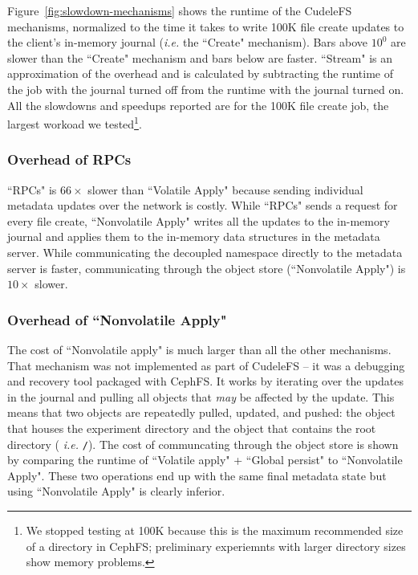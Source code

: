 Figure~\ref{fig:slowdown-mechanisms} shows the runtime of the CudeleFS
mechanisms, normalized to the time it takes to write 100K file create updates
to the client's in-memory journal ({\it i.e.} the ``Create" mechanism). Bars
above \(10^0\) are slower than the ``Create" mechanism and bars below are
faster.  ``Stream" is an approximation of the overhead and is calculated by
subtracting the runtime of the job with the journal turned off from the runtime
with the journal turned on. All the slowdowns and speedups reported are for the
100K file create job, the largest workoad we tested\footnote{We stopped testing
at 100K because this is the maximum recommended size of a directory in CephFS;
preliminary experiemnts with larger directory sizes show memory problems.}.

\subsubsection{Overhead of RPCs} ``RPCs" is \(66\times\) slower than ``Volatile
Apply" because sending individual metadata updates over the network is costly.
While ``RPCs" sends a request for every file create, ``Nonvolatile Apply"
writes all the updates to the in-memory journal and applies them to the
in-memory data structures in the metadata server. While communicating the
decoupled namespace directly to the metadata server is faster, communicating
through the object store (``Nonvolatile Apply") is \(10\times\) slower.

\subsubsection{Overhead of ``Nonvolatile Apply"} The cost of ``Nonvolatile
apply" is much larger than all the other mechanisms.  That mechanism was not
implemented as part of CudeleFS -- it was a debugging and recovery tool packaged
with CephFS. It works by iterating over the updates in the journal and pulling
all objects that {\it may} be affected by the update.  This means that two
objects are repeatedly pulled, updated, and pushed: the object that houses the
experiment directory and the object that contains the root directory ({\it
i.e.} \texttt{/}).  The cost of communcating through the object store is shown
by comparing the runtime of ``Volatile apply" + ``Global persist" to
``Nonvolatile Apply". These two operations end up with the same final metadata
state but using ``Nonvolatile Apply" is clearly inferior.

